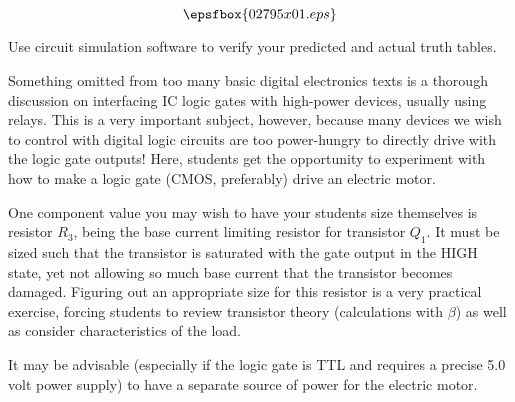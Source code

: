 

$$\epsfbox{02795x01.eps}$$

\vfil \eject






Use circuit simulation software to verify your predicted and actual truth tables.







Something omitted from too many basic digital electronics texts is a thorough discussion on interfacing IC logic gates with high-power devices, usually using relays.  This is a very important subject, however, because many devices we wish to control with digital logic circuits are too power-hungry to directly drive with the logic gate outputs!  Here, students get the opportunity to experiment with how to make a logic gate (CMOS, preferably) drive an electric motor.

One component value you may wish to have your students size themselves is resistor $R_3$, being the base current limiting resistor for transistor $Q_1$.  It must be sized such that the transistor is saturated with the gate output in the HIGH state, yet not allowing so much base current that the transistor becomes damaged.  Figuring out an appropriate size for this resistor is a very practical exercise, forcing students to review transistor theory (calculations with $\beta$) as well as consider characteristics of the load.

It may be advisable (especially if the logic gate is TTL and requires a precise 5.0 volt power supply) to have a separate source of power for the electric motor.




